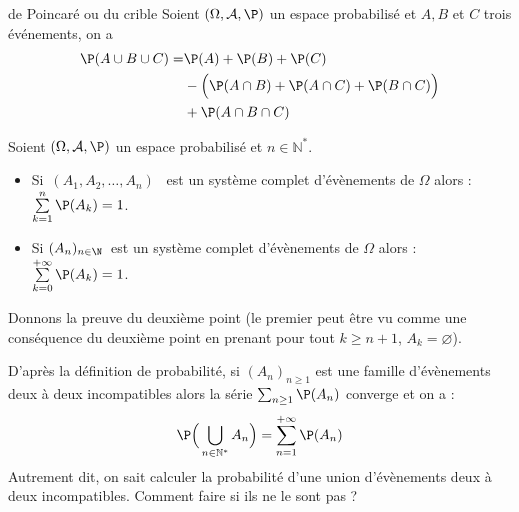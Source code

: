 \documentclass[a4paper,10pt]{report}
\begin{document}
\begin{enumerate}
\begin{Theoreme}{\label{Prop2}de Poincaré ou du crible}
Soient $(\Omega, \mathcal{A}, \P)$ un espace probabilisé et $A, B$ et $C$ trois événements, on a
 \begin{align*}
  \P(A\cup B \cup C) = & \P(A) + \P(B) + \P(C) \\
  &- \Big( \P(A\cap B) + \P(A\cap C) + \P(B\cap C) \Big) \\
  &+ \P(A\cap B \cap C)
 \end{align*}
\end{Theoreme}


\begin{Proposition}{}
Soient $(\Omega, \mathcal{A}, \P)$ un espace probabilisé et $n \in \mathbb{N}^*$.
\begin{itemize}
\item Si $\,(A_1, A_2,\ldots, A_n)$ \ est un système complet d'évènements de $\Omega$ alors :
$\sum\limits_{k=1}^{n } \P(A_k) = 1$. 
\item Si $(A_n)_{n\in \N}\,$ est un système complet d'évènements de $\Omega$ alors :
$\sum\limits_{k=0}^{+\infty } \P(A_k) = 1$. 
\end{itemize}
\end{Proposition}

\begin{Demonstration}{} Donnons la preuve du deuxième point (le premier peut être vu comme une conséquence du deuxième point en prenant pour tout $k \geq n+1$, $A_{k}= \varnothing$). 

\vspace{5cm}
%
\end{Demonstration}

\vspace{0.3cm}

D'après la définition de probabilité, si $(A_n)_{n \geq 1}$ est une famille d'évènements deux à deux incompatibles alors la série $\sum_{n \geq 1} \P(A_n)$ converge et on a : 
\[ \P\Big(\bigcup\limits_{n\in \mathbb N^*} A_n\Big) = \sum_{n=1}^{+ \infty} \P (A_n) \]
Autrement dit, on sait calculer la probabilité d'une union d'évènements deux à deux incompatibles. Comment faire si ils ne le sont pas ?


\end{enumerate}
\end{document}
